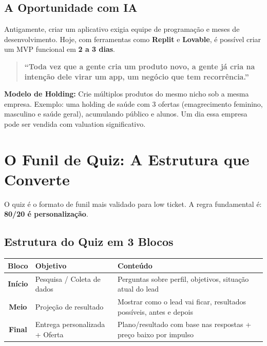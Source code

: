 \documentclass[12pt, a4paper]{article}
\begin{document}
\subsection{A Oportunidade com IA}

Antigamente, criar um aplicativo exigia equipe de programação e meses de desenvolvimento. Hoje, com ferramentas como \textbf{Replit} e \textbf{Lovable}, é possível criar um MVP funcional em \textbf{2 a 3 dias}.

\begin{quote}
\textcolor{primaryColor}{\textbf{``Toda vez que a gente cria um produto novo, a gente já cria na intenção dele virar um app, um negócio que tem recorrência.''}}
\end{quote}

\textcolor{accentColor}{\textbf{Modelo de Holding:}} Crie múltiplos produtos do mesmo nicho sob a mesma empresa. Exemplo: uma holding de saúde com 3 ofertas (emagrecimento feminino, masculino e saúde geral), acumulando público e alunos. Um dia essa empresa pode ser vendida com valuation significativo.

\needspace{8cm}

\section{O Funil de Quiz: A Estrutura que Converte}

O quiz é o formato de funil mais validado para low ticket. A regra fundamental é: \textbf{80/20 é personalização}.

\subsection{Estrutura do Quiz em 3 Blocos}

\begin{table}[H]
    \centering
    \renewcommand{\arraystretch}{1.5}
    \begin{tabularx}{\textwidth}{c X X}
        \toprule
        \rowcolor{tableHeader} \textbf{Bloco} & \textbf{Objetivo} & \textbf{Conteúdo} \\
        \midrule
        \textbf{Início} & Pesquisa / Coleta de dados & Perguntas sobre perfil, objetivos, situação atual do lead \\
        \rowcolor{lightGray}
        \textbf{Meio} & Projeção de resultado & Mostrar como o lead vai ficar, resultados possíveis, antes e depois \\
        \textbf{Final} & Entrega personalizada + Oferta & Plano/resultado com base nas respostas + preço baixo por impulso \\
        \bottomrule
    \end{tabularx}
\end{table}
\end{document}
